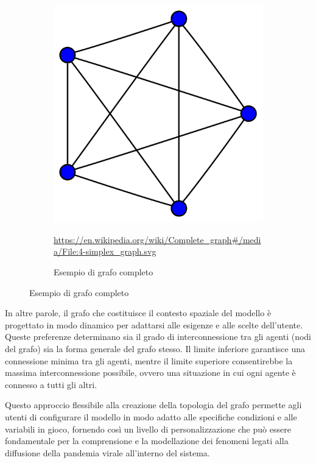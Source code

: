 \begin{figure}[H]
\begin{subfigure}[b]{0.45\textwidth}
		\includegraphics[width=\textwidth]{img/4-simplex_graph.svg.png}
		\caption{Esempio di grafo completo}
		\url{https://en.wikipedia.org/wiki/Complete_graph#/media/File:4-simplex_graph.svg}
		\label{fig:complete_graph_example}
	\end{subfigure}
\end{figure}

In altre parole, il grafo che costituisce il contesto spaziale del 
modello è progettato in modo dinamico per adattarsi alle esigenze e 
alle scelte dell'utente. Queste preferenze determinano sia il grado di 
interconnessione tra gli agenti (nodi del grafo) sia la forma generale 
del grafo stesso. Il limite inferiore garantisce una connessione minima 
tra gli agenti, mentre il limite superiore consentirebbe la massima 
interconnessione possibile, ovvero una situazione in cui ogni agente è 
connesso a tutti gli altri.

Questo approccio flessibile alla creazione della topologia del grafo 
permette agli utenti di configurare il modello in modo adatto alle 
specifiche condizioni e alle variabili in gioco, fornendo così un 
livello di personalizzazione che può essere fondamentale per la 
comprensione e la modellazione dei fenomeni legati alla diffusione della 
pandemia virale all'interno del sistema.

